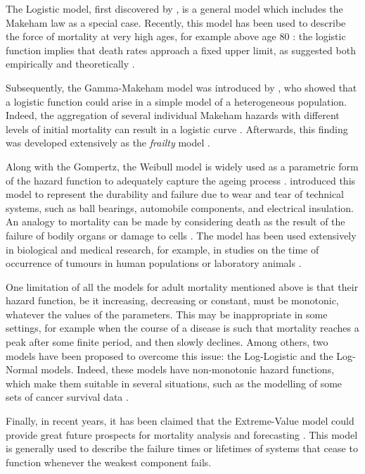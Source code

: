 \documentclass[Thesis]{subfiles}
\begin{document}
The Logistic model, first discovered by \cite{perks1932some}, is a general model which includes the Makeham law as a special case. Recently, this model has been used to describe the force of mortality at very high ages, for example above age 80 \citep{wilmoth2000increase}: the logistic function implies that death rates approach a fixed upper limit, as suggested both empirically and theoretically \citep{vaupel1998biodemographic, gampe2010human}. 

Subsequently, the Gamma-Makeham model was introduced by \cite{beard1971some}, who showed that a logistic function could arise in a simple model of a heterogeneous population. Indeed, the aggregation of several individual Makeham hazards with different levels of initial mortality can result in a logistic curve \citep{thatcher1998force}. Afterwards, this finding was developed extensively as the \emph{frailty} model \citep{vaupel1979impact}.  

Along with the Gompertz, the Weibull model is widely used as a parametric form of the hazard function to adequately capture the ageing process \citep{missov2015mortality}. \cite{weibull1951statistical} introduced this model to represent the durability and failure due to wear and tear of technical systems, such as ball bearings, automobile components, and electrical insulation. An analogy to mortality can be made by considering death as the result of the failure of bodily organs or damage to cells \citep{thatcher1998force}. The model has been used extensively in biological and medical research, for example, in studies on the time of occurrence of tumours in human populations or laboratory animals \citep{lawless2011statistical}. 

One limitation of all the models for adult mortality  mentioned above is that their hazard function, be it  increasing, decreasing or constant, must be monotonic, whatever the values of the parameters. This may be inappropriate in some settings, for example when the course of a disease is such that mortality reaches a peak after some finite period, and then slowly declines. Among others, two models have been proposed to overcome this issue: the Log-Logistic and the Log-Normal models. Indeed, these models have non-monotonic hazard functions, which make them suitable in several situations, such as the modelling of some sets of cancer survival data \citep{bennett1983log}.

Finally, in recent years, it has been claimed that the Extreme-Value model could provide great future prospects for mortality analysis and forecasting \citep{willekens2001gompertz}. This model is generally used to describe the failure times or lifetimes of systems that cease to function whenever the weakest component fails. 
\end{document}
